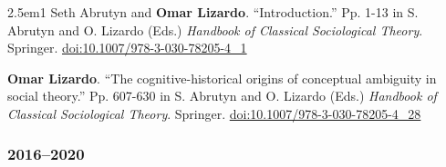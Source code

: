 \documentclass[
]{article}
\newenvironment{cventry}{\begin{hangparas}{2.5em}{1}}{\end{hangparas}}
\begin{document}
\begin{cventry}
Seth Abrutyn and \textbf{Omar Lizardo}. ``Introduction.'' Pp. 1-13 in S.
Abrutyn and O. Lizardo (Eds.) \emph{Handbook of Classical Sociological
Theory}. Springer.
\href{https://doi.org/10.1007/978-3-030-78205-4_1}{doi:10.1007/978-3-030-78205-4\_1}

\textbf{Omar Lizardo}. ``The cognitive-historical origins of conceptual
ambiguity in social theory.'' Pp. 607-630 in S. Abrutyn and O. Lizardo
(Eds.) \emph{Handbook of Classical Sociological Theory}. Springer.
\href{https://doi.org/10.1007/978-3-030-78205-4_28}{doi:10.1007/978-3-030-78205-4\_28}

\end{cventry}

\subsubsection{2016--2020}\label{section-16}
\end{document}
